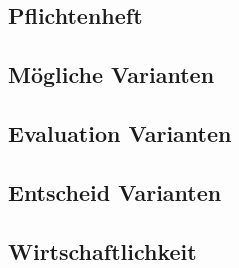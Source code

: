 \subsection{Pflichtenheft}

\subsection{Mögliche Varianten}

\subsection{Evaluation Varianten}

\subsection{Entscheid Varianten}

\subsection{Wirtschaftlichkeit}
